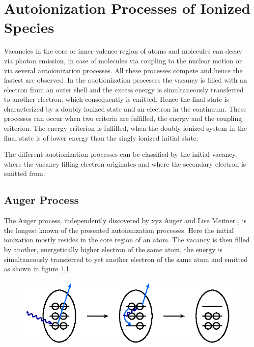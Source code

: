 \chapter{Autoionization Processes of Ionized Species}
Vacancies in the core or inner-valence region of atoms and molecules
can decay via photon emission, in case of molecules via coupling to
the nuclear motion or via several autoionization processes. All these
processes compete and hence the fastest are observed. In the auotionization
processes
the vacancy is filled with an electron from an outer shell and the excess
energy is simultaneously transferred to another electron, which consequently
is emitted. Hence the final state is characterized by a doubly ionized state
and an electron in the continuum. These processes can
occur when two criteria are fulfilled, the energy and the coupling criterion.
The energy criterion is fulfilled, when the doubly ionized system in the
final state is of lower energy than the singly ionized initial state.

The different auotionization processes can be classified by the initial
vacancy, where the
vacancy filling electron originates and where the secondary electron is
emitted from.

\section{Auger Process}
The Auger process, independently discovered by xyz Auger and Lise Meitner
\cite{}, is the longest known of the presented autoionization processes. Here
the initial ionization mostly resides in the core region of an atom. The vacancy
is then filled by another, energetically higher electron of the same atom, the
energy is simultaneously transferred to yet another electron of the same atom and
emitted as shown in figure \ref{figure:auger_process}.

\begin{figure}[h]
 \centering
 \includegraphics{pics/auger-pspic.eps}
 \caption{}
 \label{figure:auger_process}
\end{figure}


